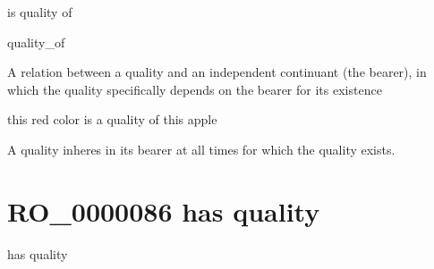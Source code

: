 \documentclass[letterpaper,10pt,english]{sphinxmanual}
\begin{document}
\begin{sphinxShadowBox}

\sphinxAtStartPar
is quality of

\sphinxAtStartPar
quality\_of
\end{sphinxShadowBox}

\begin{sphinxShadowBox}

\sphinxAtStartPar
A relation between a quality and an independent continuant (the bearer), in which the quality specifically depends on the bearer for its existence
\end{sphinxShadowBox}

\begin{sphinxShadowBox}

\sphinxAtStartPar
this red color is a quality of this apple
\end{sphinxShadowBox}

\begin{sphinxShadowBox}

\sphinxAtStartPar
A quality inheres in its bearer at all times for which the quality exists.
\end{sphinxShadowBox}

\begin{sphinxShadowBox}

\sphinxAtStartPar
{}
\end{sphinxShadowBox}
\begin{quote}
\label{\detokenize{doc-RO_0000086:ro-0000086}}\label{\detokenize{doc-RO_0000086:has-quality}}\label{\detokenize{doc-RO_0000086:ro-0000086}}
\ignorespaces \end{quote}


\section{RO\_0000086 \sphinxhyphen{} has quality}
\label{\detokenize{doc-RO_0000086:ro-0000086-has-quality}}\label{\detokenize{doc-RO_0000086:index-0}}\label{\detokenize{doc-RO_0000086::doc}}
\begin{sphinxShadowBox}

\sphinxAtStartPar
has quality
\end{sphinxShadowBox}
\end{document}

